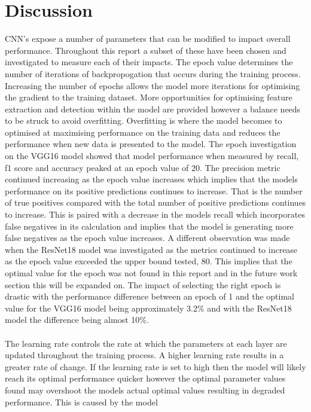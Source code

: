 \documentclass[10pt,twocolumn,letterpaper]{article}
\begin{document}
\section{Discussion}
CNN's expose a number of parameters that can be modified to impact overall performance.
Throughout this report a subset of these have been chosen and investigated to measure
each of their impacts. The epoch value determines the number of iterations of
backpropogation that occurs during the training process. Increasing the number of epochs 
allows the model more iterations for optimising the gradient to the training dataset.
More opportunities for optimising feature extraction and detection within the model 
are provided however a balance needs to be struck to avoid overfitting. Overfitting 
is where the model becomes to optimised at maximising performance on the training 
data and reduces the performance when new data is presented to the model. The epoch 
investigation on the VGG16 model showed that model performance when measured by recall,
f1 score and accuracy peaked at an epoch value of 20. The precision metric continued 
increasing as the epoch value increases which implies that the models performance on 
its positive predictions continues to increase. That is the number of true positives 
compared with the total number of positive predictions continues to increase. This 
is paired with a decrease in the models recall which incorporates false negatives in 
its calculation and implies that the model is generating more false negatives as the 
epoch value increases. A different observation was made when the ResNet18 model was
investigated as the metrics continued to increase as the epoch value exceeded the upper 
bound tested, 80. This implies that the optimal value for the epoch was not found 
in this report and in the future work section this will be expanded on. The impact 
of selecting the right epoch is drastic with the performance difference between an 
epoch of 1 and the optimal value for the VGG16 model being approximately 3.2\% 
and with the ResNet18 model the difference being almost 10\%.
\\
\\
The learning rate controls the rate at which the parameters at each layer are updated 
throughout the training process. A higher learning rate results in a greater rate of change.
If the learning rate is set to high then the model will likely reach its optimal performance 
quicker however the optimal parameter values found may overshoot the models actual 
optimal values resulting in degraded performance. This is caused by the model 
\end{document}
